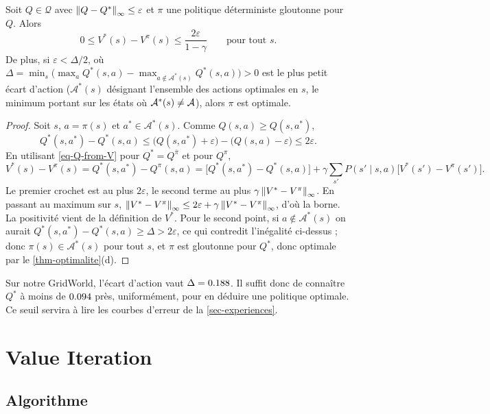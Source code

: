\begin{proposition}\label{prop-perte}
Soit $Q\in\mathcal Q$ avec $\left\lVert Q-Q^* \right\rVert_\infty\le\varepsilon$ et $\pi$ une politique déterministe gloutonne pour $Q$. Alors
\[
0\le V^*(s)-V^{\pi}(s)\le\frac{2\varepsilon}{1-\gamma}\qquad\text{pour tout }s.
\]
De plus, si $\varepsilon<\Delta/2$, où $\Delta=\min_s\big(\max_aQ^*(s,a)-\max_{a\notin\mathcal A^*(s)}Q^*(s,a)\big)>0$ est le plus petit écart d'action ($\mathcal A^*(s)$ désignant l'ensemble des actions optimales en $s$, le minimum portant sur les états où $\mathcal A^*(s)\neq\mathcal{A}$), alors $\pi$ est optimale.
\end{proposition}
\begin{proof}
Soit $s$, $a=\pi(s)$ et $a^*\in\mathcal A^*(s)$. Comme $Q(s,a)\ge Q(s,a^*)$,
\[
Q^*(s,a^*)-Q^*(s,a)\le\big(Q(s,a^*)+\varepsilon\big)-\big(Q(s,a)-\varepsilon\big)\le2\varepsilon.
\]
En utilisant \eqref{eq-Q-from-V} pour $Q^*=Q^{\bar\pi}$ et pour $Q^\pi$,
\[
V^*(s)-V^\pi(s)=Q^*(s,a^*)-Q^\pi(s,a)=\big[Q^*(s,a^*)-Q^*(s,a)\big]+\gamma\sum_{s'}P(s'\mid s,a)\big[V^*(s')-V^\pi(s')\big].
\]
Le premier crochet est au plus $2\varepsilon$, le second terme au plus $\gamma\left\lVert V^*-V^\pi \right\rVert_\infty$. En passant au maximum sur $s$, $\left\lVert V^*-V^\pi \right\rVert_\infty\le2\varepsilon+\gamma\left\lVert V^*-V^\pi \right\rVert_\infty$, d'où la borne. La positivité vient de la définition de $V^*$. Pour le second point, si $a\notin\mathcal A^*(s)$ on aurait $Q^*(s,a^*)-Q^*(s,a)\ge\Delta>2\varepsilon$, ce qui contredit l'inégalité ci-dessus ; donc $\pi(s)\in\mathcal A^*(s)$ pour tout $s$, et $\pi$ est gloutonne pour $Q^*$, donc optimale par le \cref{thm-optimalite}(d).
\end{proof}

Sur notre GridWorld, l'écart d'action vaut $\Delta=0.188$. Il suffit donc de connaître $Q^*$ à moins de $0.094$ près, uniformément, pour en déduire une politique optimale. Ce seuil servira à lire les courbes d'erreur de la \cref{sec-experiences}.

\section{Value Iteration}\label{sec-vi}

\subsection{Algorithme}

